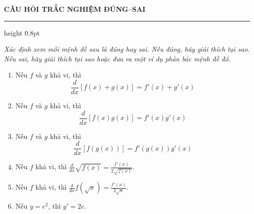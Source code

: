 \vspace{9pt}

\noindent
{\bfseries\large\textsf{\color{stewartcyan}CÂU HỎI TRẮC NGHIỆM ĐÚNG--SAI}}

\vspace{2pt}
{\color{stewartcyan}\hrule height 0.8pt}
\vspace{5pt}

\noindent
\begin{minipage}[t]{0.485\textwidth}
\textit{Xác định xem mỗi mệnh đề sau là đúng hay sai. Nếu đúng, hãy giải thích tại sao. Nếu sai, hãy giải thích tại sao hoặc đưa ra một ví dụ phản bác mệnh đề đó.}

\vspace{4pt}
\setlength{\abovedisplayskip}{2pt}
\setlength{\belowdisplayskip}{2pt}
\begin{enumerate}[label=\textbf{\arabic*.}, leftmargin=14pt, itemsep=3.5pt, topsep=1pt]
    \item Nếu $f$ và $g$ khả vi, thì
    \[
    \frac{d}{dx} [f(x) + g(x)] = f'(x) + g'(x)
    \]

    \item Nếu $f$ và $g$ khả vi, thì
    \[
    \frac{d}{dx} [f(x)g(x)] = f'(x)g'(x)
    \]

    \item Nếu $f$ và $g$ khả vi, thì
    \[
    \frac{d}{dx} [f(g(x))] = f'(g(x))g'(x)
    \]

    \item Nếu $f$ khả vi, thì $\displaystyle \frac{d}{dx}\sqrt{f(x)} = \frac{f'(x)}{2\sqrt{f(x)}}$.

    \item Nếu $f$ khả vi, thì $\displaystyle \frac{d}{dx}f(\sqrt{x}) = \frac{f'(x)}{2\sqrt{x}}$.

    \item Nếu $y = e^2$, thì $y' = 2e$.
\end{enumerate}
\end{minipage}%
\hfill
